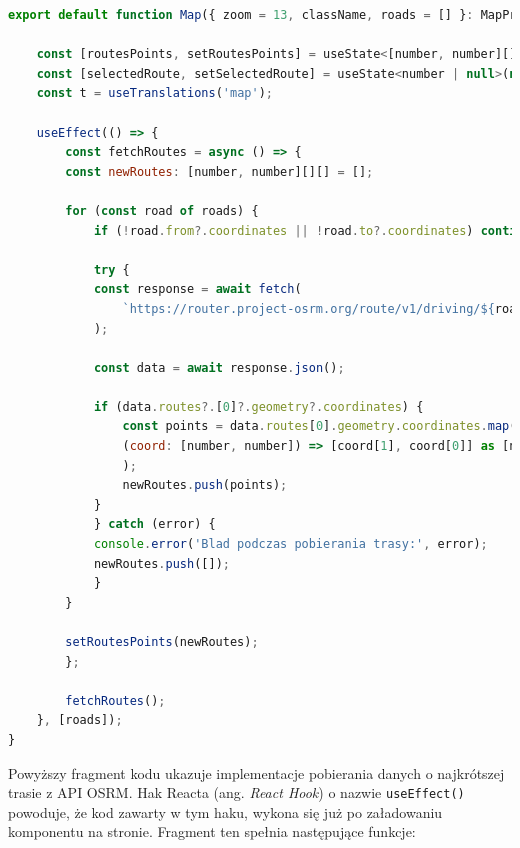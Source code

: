 \pagebreak
{\belowcaptionskip=-9pt
\begin{lstlisting}[language=JavaScript,caption=Implementacja pobierania najkrótszych tras między punktami, label=lst:fetchRoutes]
export default function Map({ zoom = 13, className, roads = [] }: MapProps) {

    const [routesPoints, setRoutesPoints] = useState<[number, number][][]>([]);
    const [selectedRoute, setSelectedRoute] = useState<number | null>(null);
    const t = useTranslations('map');

    useEffect(() => {
        const fetchRoutes = async () => {
        const newRoutes: [number, number][][] = [];

        for (const road of roads) {
            if (!road.from?.coordinates || !road.to?.coordinates) continue;

            try {
            const response = await fetch(
                `https://router.project-osrm.org/route/v1/driving/${road.from.coordinates[1]},${road.from.coordinates[0]};${road.to.coordinates[1]},${road.to.coordinates[0]}?overview=full&geometries=geojson`,
            );

            const data = await response.json();

            if (data.routes?.[0]?.geometry?.coordinates) {
                const points = data.routes[0].geometry.coordinates.map(
                (coord: [number, number]) => [coord[1], coord[0]] as [number, number],
                );
                newRoutes.push(points);
            }
            } catch (error) {
            console.error('Blad podczas pobierania trasy:', error);
            newRoutes.push([]);
            }
        }

        setRoutesPoints(newRoutes);
        };

        fetchRoutes();
    }, [roads]);
}
  \end{lstlisting}
}
  \pagebreak
  Powyższy fragment kodu ukazuje implementacje pobierania danych o najkrótszej trasie z API OSRM. Hak Reacta (ang. \emph{React Hook}) o nazwie \texttt{useEffect()} powoduje, że kod zawarty w tym haku, wykona się już po załadowaniu komponentu na stronie. Fragment ten spełnia następujące funkcje:
